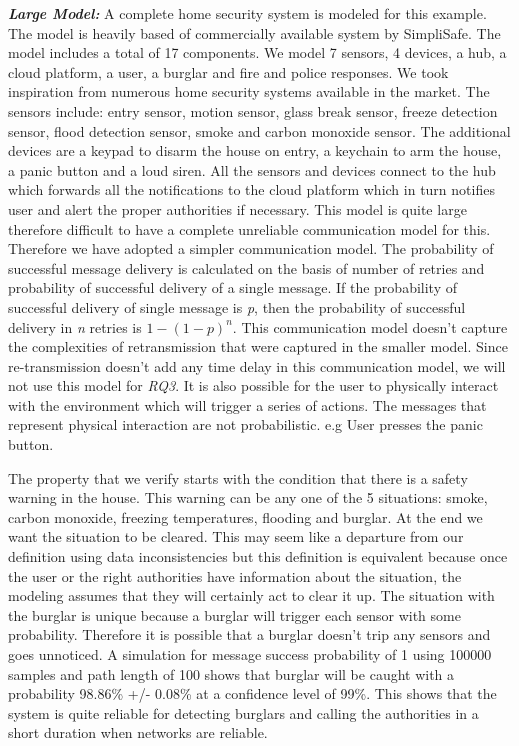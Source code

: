 \textbf{\textit{Large Model:}} A complete home security system is modeled for this example. The model is heavily based of commercially available system by SimpliSafe\cite{simplisafe}. The model includes a total of 17 components. We model 7 sensors, 4 devices, a hub, a cloud platform, a user, a burglar and fire and police responses. We took inspiration from numerous home security systems available in the market. The sensors include: entry sensor, motion sensor, glass break sensor, freeze detection sensor, flood detection sensor, smoke and carbon monoxide sensor. The additional devices are a keypad to disarm the house on entry, a keychain to arm the house, a panic button and a loud siren. All the sensors and devices connect to the hub which forwards all the notifications to the cloud platform which in turn notifies user and alert the proper authorities if necessary. This model is quite large therefore difficult to have a complete unreliable communication model for this. Therefore we have adopted a simpler communication model. The probability of successful message delivery is calculated on the basis of number of retries and probability of successful delivery of a single message. If the probability of successful delivery of single message is \textit{p}, then the probability of successful delivery in \textit{n} retries is $ 1 - (1 - p)^{n} $. This communication model doesn't capture the complexities of retransmission that were captured in the smaller model. Since re-transmission doesn't add any time delay in this communication model, we will not use this model for \textit{RQ3}. It is also possible for the user to physically interact with the environment which will trigger a series of actions. The messages that represent physical interaction are not probabilistic. e.g User presses the panic button.

The property that we verify starts with the condition that there is a safety warning in the house. This warning can be any one of the 5 situations: smoke, carbon monoxide, freezing temperatures, flooding and burglar. At the end we want the situation to be cleared. This may seem like a departure from our definition using data inconsistencies but this definition is equivalent because once the user or the right authorities have information about the situation, the modeling assumes that they will certainly act to clear it up. The situation with the burglar is unique because a burglar will trigger each sensor with some probability. Therefore it is possible that a burglar doesn't trip any sensors and goes unnoticed. A simulation for message success probability of 1 using 100000 samples and path length of 100 shows that burglar will be caught with a probability 98.86\% +/- 0.08\% at a confidence level of 99\%. This shows that the system is quite reliable for detecting burglars and calling the authorities in a short duration when networks are reliable.


